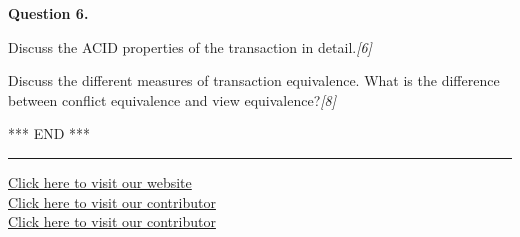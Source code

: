 \documentclass[11pt,a4paper]{article}
\newcommand{\pts}[1]{\hfill   \textit{[#1]}}
\begin{document}
\medskip


\noindent   \textbf{Question 6.}

\begin{parts}
  \item Discuss the ACID properties of the transaction in detail.\pts{6}
  \item Discuss the different measures of transaction equivalence. What is the difference between conflict equivalence and view equivalence?\pts{8}
\end{parts}
\centerline{*** END ***}

\vfill
\rule{\linewidth}{0.4pt}

\begin{center}\small
\href{https://bhu-exam.vercel.app/}{Click here to visit our website}\\[4pt]\href{https://me-aryan.vercel.app/}{Click here to visit our contributor}\\[4pt]\href{https://quashan-me.vercel.app/}{Click here to visit our contributor}
\end{center}
\end{document}
